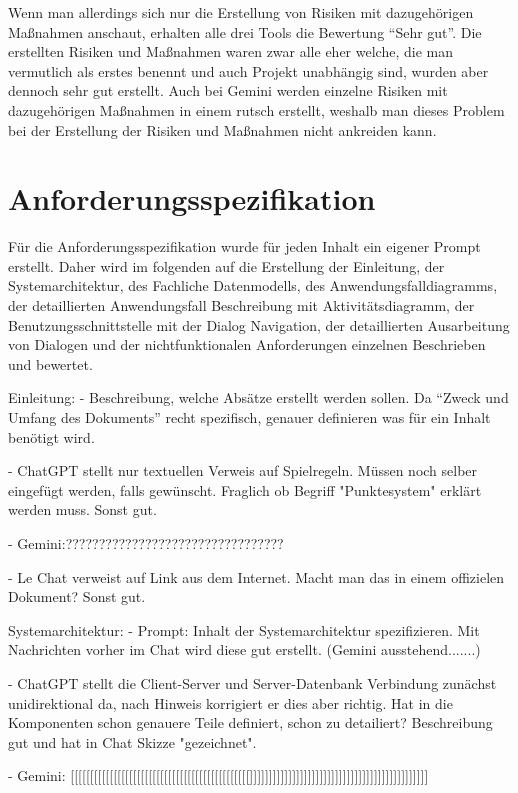Wenn man allerdings sich nur die Erstellung von Risiken mit dazugehörigen Maßnahmen anschaut, erhalten alle drei Tools die Bewertung 
``Sehr gut''. Die erstellten Risiken und Maßnahmen waren zwar alle eher welche, die man vermutlich als erstes benennt und auch 
Projekt unabhängig sind, wurden aber dennoch sehr gut erstellt. Auch bei Gemini werden einzelne Risiken mit dazugehörigen Maßnahmen 
in einem rutsch erstellt, weshalb man dieses Problem bei der Erstellung der Risiken und Maßnahmen nicht ankreiden kann.


\section{Anforderungsspezifikation}  \label{CompAnforderungsspezifikation}

Für die Anforderungsspezifikation wurde für jeden Inhalt ein eigener Prompt erstellt. Daher wird im folgenden auf die Erstellung der Einleitung, 
der Systemarchitektur, des Fachliche Datenmodells, des Anwendungsfalldiagramms, der detaillierten Anwendungsfall Beschreibung mit Aktivitätsdiagramm, 
der Benutzungsschnittstelle mit der Dialog Navigation, der detaillierten Ausarbeitung von Dialogen und der nichtfunktionalen Anforderungen einzelnen
Beschrieben und bewertet.


Einleitung:
- Beschreibung, welche Absätze erstellt werden sollen. Da ``Zweck und Umfang des Dokuments'' recht spezifisch, genauer definieren was für ein 
Inhalt benötigt wird.

- ChatGPT stellt nur textuellen Verweis auf Spielregeln. Müssen noch selber eingefügt werden, falls gewünscht. Fraglich ob Begriff "Punktesystem"
erklärt werden muss. Sonst gut.

- Gemini:?????????????????????????????????

- Le Chat verweist auf Link aus dem Internet. Macht man das in einem offizielen Dokument? Sonst gut.


Systemarchitektur:
- Prompt: Inhalt der Systemarchitektur spezifizieren. Mit Nachrichten vorher im Chat wird diese gut erstellt. (Gemini ausstehend.......)

- ChatGPT stellt die Client-Server und Server-Datenbank Verbindung zunächst unidirektional da, nach Hinweis korrigiert 
er dies aber richtig. Hat in die Komponenten schon genauere Teile definiert, schon zu detailiert? Beschreibung gut und 
hat in Chat Skizze "gezeichnet".

- Gemini: [[[[[[[[[[[[[[[[[[[[[[[[[[[[[[[[[[[[[[[[[[[[[[]]]]]]]]]]]]]]]]]]]]]]]]]]]]]]]]]]]]]]]]]]]]]]

